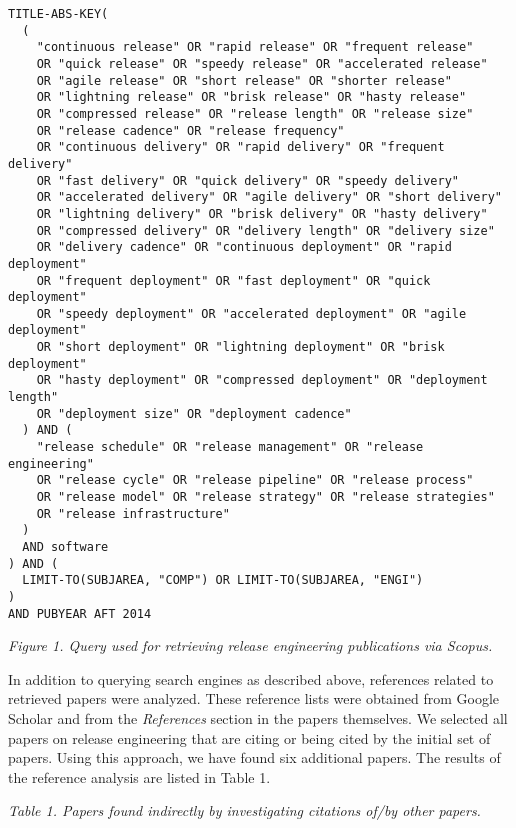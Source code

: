 \documentclass[]{book}
\begin{document}
\begin{verbatim}
TITLE-ABS-KEY(
  (
    "continuous release" OR "rapid release" OR "frequent release"
    OR "quick release" OR "speedy release" OR "accelerated release"
    OR "agile release" OR "short release" OR "shorter release"
    OR "lightning release" OR "brisk release" OR "hasty release"
    OR "compressed release" OR "release length" OR "release size"
    OR "release cadence" OR "release frequency"
    OR "continuous delivery" OR "rapid delivery" OR "frequent delivery"
    OR "fast delivery" OR "quick delivery" OR "speedy delivery"
    OR "accelerated delivery" OR "agile delivery" OR "short delivery"
    OR "lightning delivery" OR "brisk delivery" OR "hasty delivery"
    OR "compressed delivery" OR "delivery length" OR "delivery size"
    OR "delivery cadence" OR "continuous deployment" OR "rapid deployment"
    OR "frequent deployment" OR "fast deployment" OR "quick deployment"
    OR "speedy deployment" OR "accelerated deployment" OR "agile deployment"
    OR "short deployment" OR "lightning deployment" OR "brisk deployment"
    OR "hasty deployment" OR "compressed deployment" OR "deployment length"
    OR "deployment size" OR "deployment cadence"
  ) AND (
    "release schedule" OR "release management" OR "release engineering"
    OR "release cycle" OR "release pipeline" OR "release process"
    OR "release model" OR "release strategy" OR "release strategies"
    OR "release infrastructure"
  )
  AND software
) AND (
  LIMIT-TO(SUBJAREA, "COMP") OR LIMIT-TO(SUBJAREA, "ENGI")
)
AND PUBYEAR AFT 2014
\end{verbatim}

\emph{Figure 1. Query used for retrieving release engineering
publications via Scopus.}

In addition to querying search engines as described above, references
related to retrieved papers were analyzed. These reference lists were
obtained from Google Scholar and from the \emph{References} section in
the papers themselves. We selected all papers on release engineering
that are citing or being cited by the initial set of papers. Using this
approach, we have found six additional papers. The results of the
reference analysis are listed in Table 1.

\emph{Table 1. Papers found indirectly by investigating citations of/by
other papers.}
\end{document}
